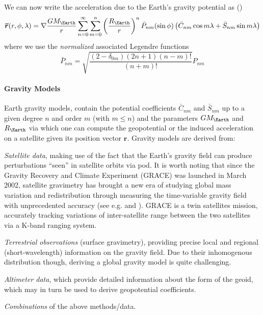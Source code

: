 We can now write the acceleration due to the Earth's gravity potential as 
(\cite{Montenbruck2000})
\begin{equation}\label{eq:mont315}
  \bm{\ddot{r}} (r, \phi, \lambda ) = \nabla \frac{GM_{\Earth}}{r} \sum_{n=0}^{\infty} \sum_{m=0}^{n} 
    \left(\frac{R_{\Earth}}{r}\right) ^n \bar{P}_{nm} (\sin \phi )
    \left( \bar{C}_{nm} \cos{m\lambda} + \bar{S}_{nm} \sin{m\lambda} \right)
\end{equation}
where we use the \emph{normalized} associated Legendre functions
\begin{equation}
  \bar{P}_{nm} = \sqrt{\frac{\left(2-\delta _{0m}\right) \left(2n+1\right) \left(n-m\right)!}{(n+m)!}} P_{nm}
\end{equation}

\paragraph{Gravity Models}\label{par:gravity-models}

Earth gravity models, contain the potential coefficients $\bar{C}_{nm}$ and $\bar{S}_{nm}$ 
up to a given degree $n$ and order $m$ (with $m \le n$) and the parameters $GM_{\Earth}$ 
and $R_{\Earth}$ via which one can compute the geopotential or the induced acceleration 
on a satellite given its position vector $\bm{r}$. Gravity models are derived from:
\begin{description}
  \item \emph{Satellite data}, making use of the fact that the Earth's gravity field 
    can produce perturbations ``seen'' in satellite orbits via \gls{pod}. It is worth 
    noting that since the Gravity Recovery and Climate Experiment (GRACE) was launched 
    in March 2002, satellite gravimetry has brought a new era of studying global mass 
    variation and redistribution through measuring the time-variable gravity field with 
    unprecedented accuracy (see e.g. \cite{Chen2022} and \cite{Jaggi2023}). GRACE is a 
    twin satellites mission, accurately tracking variations of inter-satellite range between 
    the two satellites via a K-band ranging system.
  \item \emph{Terrestrial observations} (surface gravimetry), providing precise local 
    and regional (short-wavelength) information on the gravity field. Due to their 
    inhomogenous distribution though, deriving a global gravity model is quite challenging.
  \item \emph{Altimeter data}, which provide detailed information about the form of the 
    geoid, which may in turn be used to derive geopotential coefficients.
  \item \emph{Combinations} of the above methods/data.
\end{description}

